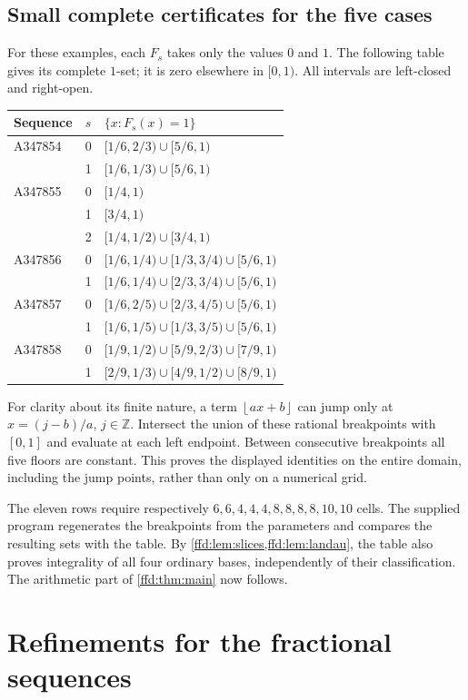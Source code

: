 \documentclass[11pt]{article}
\theoremstyle{definition}
\theoremstyle{remark}
\newcommand{\Z}{\mathbb Z}
\newcommand{\floor}[1]{\left\lfloor #1\right\rfloor}
\begin{document}
\subsection{Small complete certificates for the five cases}\label{ffd:sec:floor-table}
For these examples, each $F_s$ takes only the values $0$ and $1$. The following
table gives its complete $1$-set; it is zero elsewhere in $[0,1)$.
All intervals are left-closed and right-open.
\begin{center}
\small
\renewcommand{\arraystretch}{1.32}
\begin{tabular}{lc l}
\toprule
Sequence & $s$ & $\{x:F_s(x)=1\}$\\
\midrule
A347854&0&$[1/6,2/3)\cup[5/6,1)$\\
&1&$[1/6,1/3)\cup[5/6,1)$\\
A347855&0&$[1/4,1)$\\
&1&$[3/4,1)$\\
&2&$[1/4,1/2)\cup[3/4,1)$\\
A347856&0&$[1/6,1/4)\cup[1/3,3/4)\cup[5/6,1)$\\
&1&$[1/6,1/4)\cup[2/3,3/4)\cup[5/6,1)$\\
A347857&0&$[1/6,2/5)\cup[2/3,4/5)\cup[5/6,1)$\\
&1&$[1/6,1/5)\cup[1/3,3/5)\cup[5/6,1)$\\
A347858&0&$[1/9,1/2)\cup[5/9,2/3)\cup[7/9,1)$\\
&1&$[2/9,1/3)\cup[4/9,1/2)\cup[8/9,1)$\\
\bottomrule
\end{tabular}
\end{center}
For clarity about its finite nature, a term $\floor{ax+b}$ can jump only at
$x=(j-b)/a$, $j\in\Z$. Intersect the union of these rational breakpoints with
$[0,1]$ and evaluate at each left endpoint. Between consecutive breakpoints
all five floors are constant. This proves the displayed identities on the
entire domain, including the jump points, rather than only on a numerical grid.

The eleven rows require respectively $6,6,4,4,4,8,8,8,8,10,10$ cells. The
supplied program regenerates the breakpoints from the parameters and compares
the resulting sets with the table. By \cref{ffd:lem:slices,ffd:lem:landau}, the table
also proves integrality of all four ordinary bases, independently of their
classification. The arithmetic part of \cref{ffd:thm:main} now follows.

\section{Refinements for the fractional sequences}\label{ffd:sec:refinements}
\end{document}

